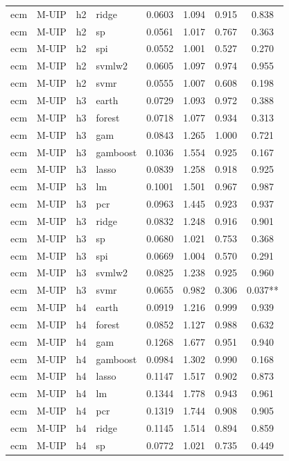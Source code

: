 \begin{ThreePartTable}
\begin{longtable}[t]{llclcccc}
ecm & M-UIP & h2 & ridge & 0.0603 & 1.094 & 0.915 & 0.838\\
ecm & M-UIP & h2 & sp & 0.0561 & 1.017 & 0.767 & 0.363\\
ecm & M-UIP & h2 & spi & 0.0552 & 1.001 & 0.527 & 0.270\\
ecm & M-UIP & h2 & svmlw2 & 0.0605 & 1.097 & 0.974 & 0.955\\
ecm & M-UIP & h2 & svmr & 0.0555 & 1.007 & 0.608 & 0.198\\
\addlinespace
ecm & M-UIP & h3 & earth & 0.0729 & 1.093 & 0.972 & 0.388\\
ecm & M-UIP & h3 & forest & 0.0718 & 1.077 & 0.934 & 0.313\\
ecm & M-UIP & h3 & gam & 0.0843 & 1.265 & 1.000 & 0.721\\
ecm & M-UIP & h3 & gamboost & 0.1036 & 1.554 & 0.925 & 0.167\\
ecm & M-UIP & h3 & lasso & 0.0839 & 1.258 & 0.918 & 0.925\\
ecm & M-UIP & h3 & lm & 0.1001 & 1.501 & 0.967 & 0.987\\
ecm & M-UIP & h3 & pcr & 0.0963 & 1.445 & 0.923 & 0.937\\
ecm & M-UIP & h3 & ridge & 0.0832 & 1.248 & 0.916 & 0.901\\
ecm & M-UIP & h3 & sp & 0.0680 & 1.021 & 0.753 & 0.368\\
ecm & M-UIP & h3 & spi & 0.0669 & 1.004 & 0.570 & 0.291\\
ecm & M-UIP & h3 & svmlw2 & 0.0825 & 1.238 & 0.925 & 0.960\\
ecm & M-UIP & h3 & svmr & 0.0655 & 0.982 & 0.306 & 0.037**\\
\addlinespace
ecm & M-UIP & h4 & earth & 0.0919 & 1.216 & 0.999 & 0.939\\
ecm & M-UIP & h4 & forest & 0.0852 & 1.127 & 0.988 & 0.632\\
ecm & M-UIP & h4 & gam & 0.1268 & 1.677 & 0.951 & 0.940\\
ecm & M-UIP & h4 & gamboost & 0.0984 & 1.302 & 0.990 & 0.168\\
ecm & M-UIP & h4 & lasso & 0.1147 & 1.517 & 0.902 & 0.873\\
ecm & M-UIP & h4 & lm & 0.1344 & 1.778 & 0.943 & 0.961\\
ecm & M-UIP & h4 & pcr & 0.1319 & 1.744 & 0.908 & 0.905\\
ecm & M-UIP & h4 & ridge & 0.1145 & 1.514 & 0.894 & 0.859\\
ecm & M-UIP & h4 & sp & 0.0772 & 1.021 & 0.735 & 0.449\\

\end{longtable}
\end{ThreePartTable}
